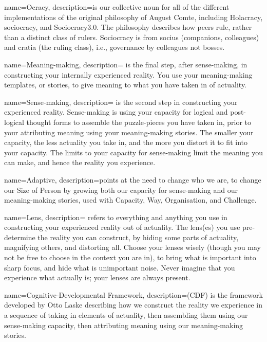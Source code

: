{
  name=Ocracy,
  description={is our collective noun for all of the different implementations of the original philosophy of August Comte, including Holacracy, sociocracy, and Sociocracy3.0. The philosophy describes how peers rule, rather than a distinct class of rulers. Sociocracy is from socius (companions, colleagues) and cratia (the ruling class), i.e., governance by colleagues not bosses.}
}






{
  name=Meaning-making,
  description={ is the final step, after sense\hyp{}making, in constructing your internally experienced reality. You use your meaning\hyp{}making templates, or stories, to give meaning to what you have taken in of actuality.}
}




{
  name=Sense-making,
  description={ is the second step in constructing your experienced reality. Sense-making is  using your capacity for logical and post\hyp{}logical thought forms to assemble the puzzle\hyp{}pieces you have taken in, prior to your attributing meaning using your meaning\hyp{}making stories. The smaller your capacity, the less actuality you take in, and the more you distort it to fit into your capacity. The limits to your capacity for sense\hyp{}making limit the meaning you can make, and hence the reality you experience.}
}




{
  name=Adaptive,
  description={points at the need to change who we are, to change our Size of Person by growing both our capacity for sense\hyp{}making and our meaning\hyp{}making stories, used with Capacity, Way, Organisation, and Challenge.}
}




{
  name=Lens,
  description={ refers to everything and anything you use in constructing your experienced reality out of actuality. The lens(es) you use pre-determine the reality you can construct, by hiding some parts of actuality, magnifying others, and distorting all. Choose your lenses wisely (though you may not be free to choose in the context you are in), to bring what is important into sharp focus, and hide what is unimportant noise. Never imagine that you experience what actually is; your lenses are always present.}
}




{
  name=Cognitive-Developmental Framework,
  description={(CDF) is the framework developed by Otto Laske describing how we construct the reality we experience in a sequence of taking in elements of actuality, then assembling them using our sense\hyp{}making capacity, then attributing meaning using our meaning\hyp{}making stories.}
}




